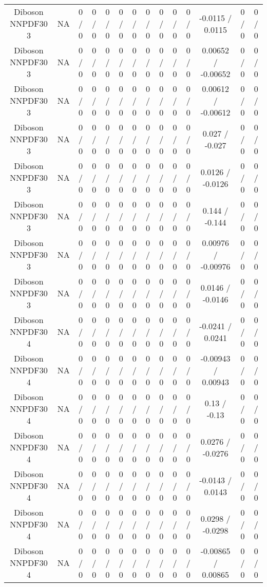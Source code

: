 \documentclass[10pt]{article}
\begin{document}
\begin{table}[htbp]
\begin{center}
\begin{tabular}{|c|c|c|c|c|c|c|c|c|c|c|c|c|c|}
  Diboson NNPDF30 3 &    NA    & 0 / 0 & 0 / 0 & 0 / 0 & 0 / 0 & 0 / 0 & 0 / 0 & 0 / 0 & 0 / 0 & 0 / 0 & -0.0115 / 0.0115 & 0 / 0 & 0 / 0 \\ 
  Diboson NNPDF30 3 &    NA    & 0 / 0 & 0 / 0 & 0 / 0 & 0 / 0 & 0 / 0 & 0 / 0 & 0 / 0 & 0 / 0 & 0 / 0 & 0.00652 / -0.00652 & 0 / 0 & 0 / 0 \\ 
  Diboson NNPDF30 3 &    NA    & 0 / 0 & 0 / 0 & 0 / 0 & 0 / 0 & 0 / 0 & 0 / 0 & 0 / 0 & 0 / 0 & 0 / 0 & 0.00612 / -0.00612 & 0 / 0 & 0 / 0 \\ 
  Diboson NNPDF30 3 &    NA    & 0 / 0 & 0 / 0 & 0 / 0 & 0 / 0 & 0 / 0 & 0 / 0 & 0 / 0 & 0 / 0 & 0 / 0 & 0.027 / -0.027 & 0 / 0 & 0 / 0 \\ 
  Diboson NNPDF30 3 &    NA    & 0 / 0 & 0 / 0 & 0 / 0 & 0 / 0 & 0 / 0 & 0 / 0 & 0 / 0 & 0 / 0 & 0 / 0 & 0.0126 / -0.0126 & 0 / 0 & 0 / 0 \\ 
  Diboson NNPDF30 3 &    NA    & 0 / 0 & 0 / 0 & 0 / 0 & 0 / 0 & 0 / 0 & 0 / 0 & 0 / 0 & 0 / 0 & 0 / 0 & 0.144 / -0.144 & 0 / 0 & 0 / 0 \\ 
  Diboson NNPDF30 3 &    NA    & 0 / 0 & 0 / 0 & 0 / 0 & 0 / 0 & 0 / 0 & 0 / 0 & 0 / 0 & 0 / 0 & 0 / 0 & 0.00976 / -0.00976 & 0 / 0 & 0 / 0 \\ 
  Diboson NNPDF30 3 &    NA    & 0 / 0 & 0 / 0 & 0 / 0 & 0 / 0 & 0 / 0 & 0 / 0 & 0 / 0 & 0 / 0 & 0 / 0 & 0.0146 / -0.0146 & 0 / 0 & 0 / 0 \\ 
  Diboson NNPDF30 4 &    NA    & 0 / 0 & 0 / 0 & 0 / 0 & 0 / 0 & 0 / 0 & 0 / 0 & 0 / 0 & 0 / 0 & 0 / 0 & -0.0241 / 0.0241 & 0 / 0 & 0 / 0 \\ 
  Diboson NNPDF30 4 &    NA    & 0 / 0 & 0 / 0 & 0 / 0 & 0 / 0 & 0 / 0 & 0 / 0 & 0 / 0 & 0 / 0 & 0 / 0 & -0.00943 / 0.00943 & 0 / 0 & 0 / 0 \\ 
  Diboson NNPDF30 4 &    NA    & 0 / 0 & 0 / 0 & 0 / 0 & 0 / 0 & 0 / 0 & 0 / 0 & 0 / 0 & 0 / 0 & 0 / 0 & 0.13 / -0.13 & 0 / 0 & 0 / 0 \\ 
  Diboson NNPDF30 4 &    NA    & 0 / 0 & 0 / 0 & 0 / 0 & 0 / 0 & 0 / 0 & 0 / 0 & 0 / 0 & 0 / 0 & 0 / 0 & 0.0276 / -0.0276 & 0 / 0 & 0 / 0 \\ 
  Diboson NNPDF30 4 &    NA    & 0 / 0 & 0 / 0 & 0 / 0 & 0 / 0 & 0 / 0 & 0 / 0 & 0 / 0 & 0 / 0 & 0 / 0 & -0.0143 / 0.0143 & 0 / 0 & 0 / 0 \\ 
  Diboson NNPDF30 4 &    NA    & 0 / 0 & 0 / 0 & 0 / 0 & 0 / 0 & 0 / 0 & 0 / 0 & 0 / 0 & 0 / 0 & 0 / 0 & 0.0298 / -0.0298 & 0 / 0 & 0 / 0 \\ 
  Diboson NNPDF30 4 &    NA    & 0 / 0 & 0 / 0 & 0 / 0 & 0 / 0 & 0 / 0 & 0 / 0 & 0 / 0 & 0 / 0 & 0 / 0 & -0.00865 / 0.00865 & 0 / 0 & 0 / 0 \\ 

\end{tabular}
\end{center}
\end{table}
\end{document}
